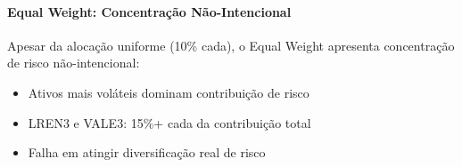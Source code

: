 \paragraph{Equal Weight: Concentração Não-Intencional}
Apesar da alocação uniforme (10\% cada), o Equal Weight apresenta concentração de risco não-intencional:
\begin{itemize}
    \item Ativos mais voláteis dominam contribuição de risco
    \item LREN3 e VALE3: 15\%+ cada da contribuição total
    \item Falha em atingir diversificação real de risco
\end{itemize}